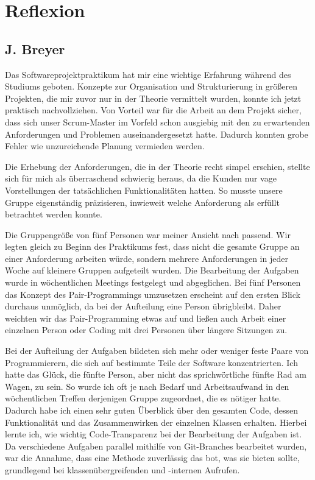 \documentclass[oneside,abstractoff,a4paper]{scrartcl}
\begin{document}
\section{Reflexion}

\subsection{J. Breyer}
Das Softwareprojektpraktikum hat mir eine wichtige Erfahrung während des Studiums geboten. Konzepte zur Organisation und Strukturierung in größeren Projekten, die mir zuvor nur in der Theorie vermittelt wurden, konnte ich jetzt praktisch nachvollziehen. Von Vorteil war für die Arbeit an dem Projekt sicher, dass sich unser Scrum-Master im Vorfeld schon ausgiebig mit den zu erwartenden Anforderungen und Problemen auseinandergesetzt hatte. Dadurch konnten grobe Fehler wie unzureichende Planung vermieden werden.

Die Erhebung der Anforderungen, die in der Theorie recht simpel erschien, stellte sich für mich als überraschend schwierig heraus, da die Kunden nur vage Vorstellungen der tatsächlichen Funktionalitäten hatten. So musste unsere Gruppe eigenständig präzisieren, inwieweit welche Anforderung als erfüllt betrachtet werden konnte.

Die Gruppengröße von fünf Personen war meiner Ansicht nach passend. Wir legten gleich zu Beginn des Praktikums fest, dass nicht die gesamte Gruppe an einer Anforderung arbeiten würde, sondern mehrere Anforderungen in jeder Woche auf kleinere Gruppen aufgeteilt wurden. Die Bearbeitung der Aufgaben wurde in wöchentlichen Meetings festgelegt und abgeglichen. Bei fünf Personen das Konzept des Pair-Programmings umzusetzen erscheint auf den ersten Blick durchaus unmöglich, da bei der Aufteilung eine Person übrigbleibt. Daher weichten wir das Pair-Programming etwas auf und ließen auch Arbeit einer einzelnen Person oder Coding mit drei Personen über längere Sitzungen zu.

Bei der Aufteilung der Aufgaben bildeten sich mehr oder weniger feste Paare von Programmierern, die sich auf bestimmte Teile der Software konzentrierten. Ich hatte das Glück, die fünfte Person, aber nicht das sprichwörtliche fünfte Rad am Wagen, zu sein. So wurde ich oft je nach Bedarf und Arbeitsaufwand in den wöchentlichen Treffen derjenigen Gruppe zugeordnet, die es nötiger hatte. Dadurch habe ich einen sehr guten Überblick über den gesamten Code, dessen Funktionalität und das Zusammenwirken der einzelnen Klassen erhalten. Hierbei lernte ich, wie wichtig Code-Transparenz bei der Bearbeitung der Aufgaben ist. Da verschiedene Aufgaben parallel mithilfe von Git-Branches bearbeitet wurden, war die Annahme, dass eine Methode zuverlässig das bot, was sie bieten sollte, grundlegend bei klassenübergreifenden und -internen Aufrufen.
\end{document}
